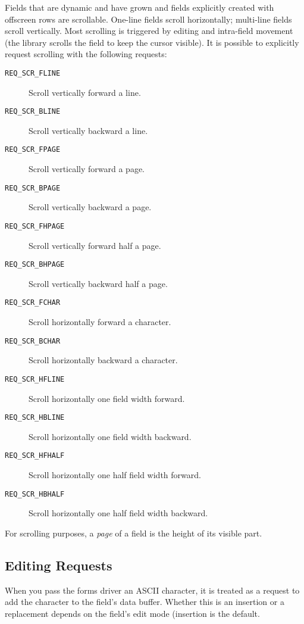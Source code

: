 \label{f0:fscroll}Fields that are dynamic and have grown and fields explicitly created
with offscreen rows are scrollable.  One-line fields scroll horizontally;
multi-line fields scroll vertically.  Most scrolling is triggered by
editing and intra-field movement (the library scrolls the field to keep the
cursor visible).  It is possible to explicitly request scrolling with the
following requests:
\begin{description}
\item[ \texttt{REQ\_SCR\_FLINE}]  Scroll vertically forward a line.
\item[ \texttt{REQ\_SCR\_BLINE}]  Scroll vertically backward a line.
\item[ \texttt{REQ\_SCR\_FPAGE}]  Scroll vertically forward a page.
\item[ \texttt{REQ\_SCR\_BPAGE}]  Scroll vertically backward a page.
\item[ \texttt{REQ\_SCR\_FHPAGE}]  Scroll vertically forward half a page.
\item[ \texttt{REQ\_SCR\_BHPAGE}]  Scroll vertically backward half a page.
\item[ \texttt{REQ\_SCR\_FCHAR}]  Scroll horizontally forward a character.
\item[ \texttt{REQ\_SCR\_BCHAR}]  Scroll horizontally backward a character.
\item[ \texttt{REQ\_SCR\_HFLINE}]  Scroll horizontally one field width forward.
\item[ \texttt{REQ\_SCR\_HBLINE}]  Scroll horizontally one field width backward.
\item[ \texttt{REQ\_SCR\_HFHALF}]  Scroll horizontally one half field width forward.
\item[ \texttt{REQ\_SCR\_HBHALF}]  Scroll horizontally one half field width backward.
\end{description}
For scrolling purposes, a \emph{page} of a field is the height
of its visible part.

\subsection{Editing Requests}

\label{f0:fedit}When you pass the forms driver an ASCII character, it is treated as a
request to add the character to the field's data buffer.  Whether this
is an insertion or a replacement depends on the field's edit mode
(insertion is the default. 

